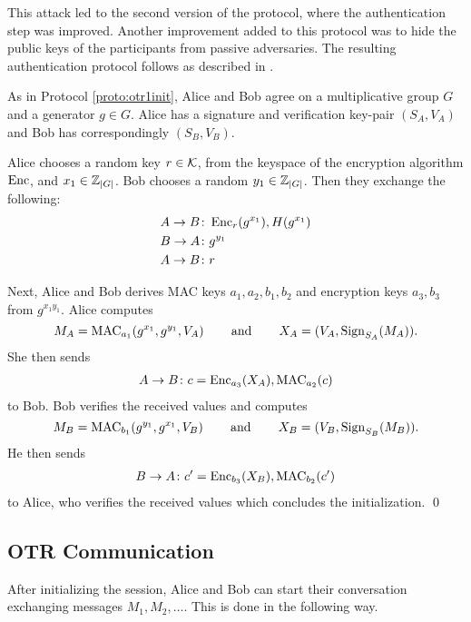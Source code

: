 This attack led to the second version of the protocol, where the authentication 
step was improved.
Another improvement added to this protocol was to hide the public keys of the 
participants from passive adversaries.
The resulting authentication protocol follows as described in \cite{otr2007}.

\begin{protocol}
  \label{proto:otr2init}
  As in Protocol \ref{proto:otr1init}, Alice and Bob agree on a multiplicative 
  group \(G\) and a generator \(g\in G\).
  Alice has a signature and verification key-pair \((S_A, V_A)\) and Bob has 
  correspondingly \((S_B, V_B)\).

  Alice chooses a random key \(r\in \operatorname{\mathcal K}\), from the keyspace of the encryption 
  algorithm \(\operatorname{\mathrm{Enc}}\), and \(x_1\in \operatorname{\mathbb Z}_{|G|}\).
  Bob chooses a random \(y_1\in \operatorname{\mathbb Z}_{|G|}\).
  Then they exchange the following:
  \begin{align*}
    A\to B &\colon \operatorname{\mathrm{Enc}}_r( g^{x_1} ), H( g^{x_1} ) \\
    B\to A &\colon g^{y_1} \\
    A\to B &\colon r
  \end{align*}

  Next, Alice and Bob derives \ac{MAC} keys \(a_1, a_2, b_1, b_2\) and 
  encryption keys \(a_3, b_3\) from \(g^{x_1 y_1}\).
  Alice computes \[M_A = \operatorname{\mathrm{MAC}}_{a_1}( g^{x_1}, g^{y_1}, V_A )\operatorname{\qquad and\qquad} X_A 
  = ( V_A, \operatorname{\mathrm{Sign}}_{S_A}( M_A ) ).\]
  She then sends
  \begin{align*}
    A\to B\colon c = \operatorname{\mathrm{Enc}}_{a_3}( X_A ), \operatorname{\mathrm{MAC}}_{a_2}( c )
  \end{align*}
  to Bob.
  Bob verifies the received values and computes \[M_B = \operatorname{\mathrm{MAC}}_{b_1}( g^{y_1}, 
  g^{x_1}, V_B )\operatorname{\qquad and\qquad} X_B = ( V_B, \operatorname{\mathrm{Sign}}_{S_B}( M_B ) ).\]
  He then sends
  \begin{align*}
    B\to A\colon c^\prime = \operatorname{\mathrm{Enc}}_{b_3}( X_B ), \operatorname{\mathrm{MAC}}_{b_2}( c^\prime )
  \end{align*}
  to Alice, who verifies the received values which concludes the 
  initialization.
  \qed
\end{protocol}

\subsection{\acs{OTR} Communication}

After initializing the session, Alice and Bob can start their conversation 
exchanging messages \(M_1, M_2, \ldots\).
This is done in the following way.

